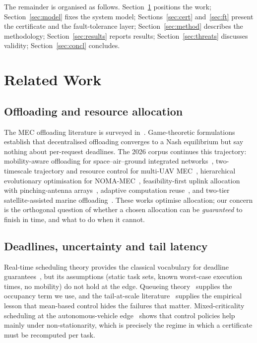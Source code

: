 \documentclass[journal,10pt]{IEEEtran}
\begin{document}
The remainder is organised as follows.
Section~\ref{sec:related} positions the work; Section~\ref{sec:model} fixes the
system model; Sections~\ref{sec:cert} and~\ref{sec:ft} present the certificate
and the fault-tolerance layer; Section~\ref{sec:method} describes the
methodology; Section~\ref{sec:results} reports results;
Section~\ref{sec:threats} discusses validity; Section~\ref{sec:concl} concludes.

\section{Related Work}
\label{sec:related}

\subsection{Offloading and resource allocation}
The MEC offloading literature is surveyed in~\cite{mao2017survey,mach2017survey}.
Game-theoretic formulations~\cite{chen2015game} establish that decentralised
offloading converges to a Nash equilibrium but say nothing about per-request
deadlines. The 2026 corpus continues this trajectory: mobility-aware offloading
for space--air--ground integrated networks~\cite{sun2026sagin}, two-timescale
trajectory and resource control for multi-UAV
MEC~\cite{li2026multiuav,zhang2026trajectory}, hierarchical evolutionary
optimisation for NOMA-MEC~\cite{jiao2026hiea}, feasibility-first uplink
allocation with pinching-antenna arrays~\cite{abolhasani2026pass}, adaptive
computation reuse~\cite{he2026reuse}, and two-tier satellite-assisted marine
offloading~\cite{wang2026marine}. These works optimise allocation; our concern is
the orthogonal question of whether a chosen allocation can be \emph{guaranteed}
to finish in time, and what to do when it cannot.

\subsection{Deadlines, uncertainty and tail latency}
Real-time scheduling theory provides the classical vocabulary for deadline
guarantees~\cite{liu1973scheduling}, but its assumptions (static task sets,
known worst-case execution times, no mobility) do not hold at the edge. Queueing
theory~\cite{kleinrock1975queueing,little1961proof} supplies the occupancy
term we use, and the tail-at-scale
literature~\cite{dean2013tail} supplies the empirical lesson that mean-based
control hides the failures that matter. Mixed-criticality scheduling at the
autonomous-vehicle edge~\cite{zakerian2026llm} shows that control policies help
mainly under non-stationarity, which is precisely the regime in which a
certificate must be recomputed per task.
\end{document}
